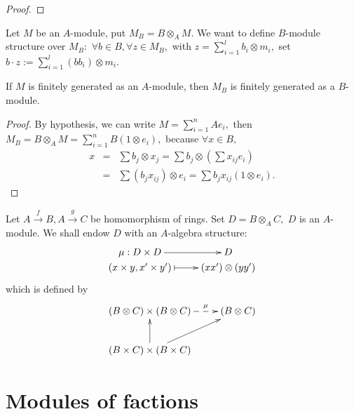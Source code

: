 \begin{proof}

\end{proof}
\begin{Def}
Let $M$ be an $A$-module, put $M_B=B\otimes_A M.$ We want to define
$B$-module structure over $M_B:$ $\forall b\in B, \forall z\in M_B,$
with $z=\sum\limits_{i=1}^l b_i\otimes m_i,$ set $b\cdot z:=
\sum\limits_{i=1}^l (bb_i)\otimes m_i.$
\end{Def}
\begin{prop}
If $M$ is finitely generated as an $A$-module, then $M_B$ is
finitely generated as a $B$-module.
\end{prop}
\begin{proof}
By hypothesis, we can write $M=\sum\limits_{i=1}^n Ae_i,$ then $M_B
= B\otimes_A M = \sum\limits_{i=1}^n B(1\otimes e_i),$ because
$\forall x\in B,$
\begin{eqnarray*}
x & = & \sum b_j\otimes x_j = \sum b_j\otimes(\sum x_{ij}e_i) \\
& = & \sum (b_jx_{ij})\otimes e_i = \sum b_jx_{ij}(1\otimes e_i).
\end{eqnarray*}
\end{proof}
Let $A\stackrel{f}{\rightarrow} B, A\stackrel{g}{\rightarrow} C$ be
homomorphism of rings. Set $D=B\otimes_A C,$ $D$ is an $A$-module.
We shall endow $D$ with an $A$-algebra structure:
\[ \xymatrix@R=0em{
   \mu: D\times D \ar[r] & D  \\
   (x\times y, x^{\prime}\times y^{\prime}) \ar@{|->}[r] &
   (xx^{\prime})\otimes (yy^{\prime}) }  \]
which is defined by
\[ \xymatrix{
   (B\otimes C)\times (B\otimes C) \ar@{-->}[r]^-{\mu} & (B\otimes
   C) \\
   (B\times C)\times (B\times C) \ar[u] \ar[ur] }  \]

\newpage

\section{Modules of factions}

